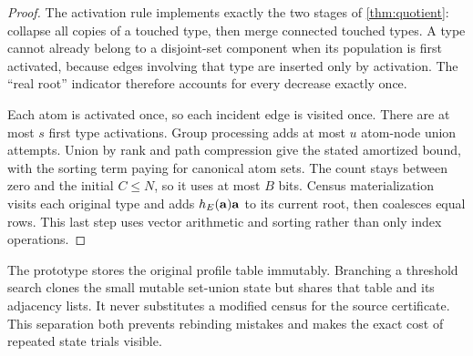 \begin{proof}
The activation rule implements exactly the two stages of
\cref{thm:quotient}: collapse all copies of a touched type, then merge
connected touched types. A type cannot already belong to a disjoint-set
component when its population is first activated, because edges involving
that type are inserted only by activation. The ``real root'' indicator
therefore accounts for every decrease exactly once.

Each atom is activated once, so each incident edge is visited once. There
are at most $s$ first type activations. Group processing adds at most $u$
atom-node union attempts. Union by rank and path compression give the
stated amortized bound, with the sorting term paying for canonical atom
sets. The count stays between zero and the initial $C\le N$, so it uses at
most $B$ bits. Census materialization visits each original type and adds
$h_E(\mathbf a)\mathbf a$ to its current root, then coalesces equal rows.
This last step uses vector arithmetic and sorting rather than only index
operations.
\end{proof}

The prototype stores the original profile table immutably. Branching a
threshold search clones the small mutable set-union state but shares that
table and its adjacency lists. It never substitutes a modified census for
the source certificate. This separation both prevents rebinding mistakes
and makes the exact cost of repeated state trials visible.
